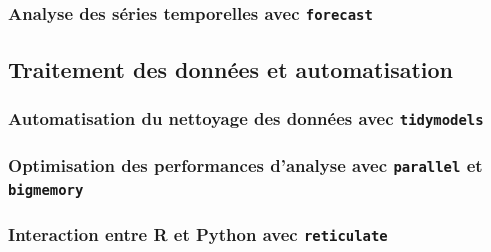 \documentclass[
  letterpaper,
  DIV=11,
  numbers=noendperiod]{scrartcl}
\begin{document}
\subsubsection{\texorpdfstring{Analyse des séries temporelles avec
\texttt{forecast}}{Analyse des séries temporelles avec forecast}}\label{analyse-des-suxe9ries-temporelles-avec-forecast}

\subsection{Traitement des données et
automatisation}\label{traitement-des-donnuxe9es-et-automatisation}

\subsubsection{\texorpdfstring{Automatisation du nettoyage des données
avec
\texttt{tidymodels}}{Automatisation du nettoyage des données avec tidymodels}}\label{automatisation-du-nettoyage-des-donnuxe9es-avec-tidymodels}

\subsubsection{\texorpdfstring{Optimisation des performances d'analyse
avec \texttt{parallel} et
\texttt{bigmemory}}{Optimisation des performances d'analyse avec parallel et bigmemory}}\label{optimisation-des-performances-danalyse-avec-parallel-et-bigmemory}

\subsubsection{\texorpdfstring{Interaction entre R et Python avec
\texttt{reticulate}}{Interaction entre R et Python avec reticulate}}\label{interaction-entre-r-et-python-avec-reticulate}
\end{document}
